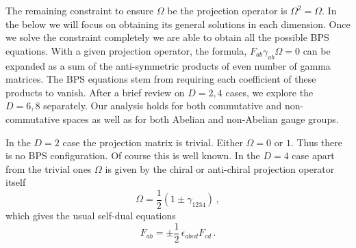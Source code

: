 \documentclass[a4paper,11pt]{article}
\begin{document}
The remaining constraint to ensure $\Omega$ be the projection operator is $\Omega^{2}=\Omega$. In the below we will focus on obtaining its general
solutions in each dimension. Once we solve the constraint completely we are able to obtain all the possible  BPS equations. With a given projection
operator, the formula,  $F_{ab}\gamma_{ab}\Omega =0$ can be expanded as a sum of the anti-symmetric products of even number of gamma matrices. The
BPS equations stem from requiring each coefficient of these products to vanish. After a brief review on $D=2,4$ cases, we explore the $D=6,8$
separately. Our analysis holds for both commutative and non-commutative spaces as well as for both Abelian and non-Abelian gauge groups.


In the $D=2$ case the projection matrix is trivial. Either $\Omega=0$ or $1$. Thus there is no BPS configuration. Of course this is well known. In
the $D=4$ case apart from the trivial ones $\Omega$ is given by the chiral or anti-chiral projection operator itself
\begin{equation}
\Omega=\textstyle{\frac{1}{2}}(1\pm\gamma_{1234})\,,
\end{equation}
which gives the usual self-dual equations
\begin{equation}
F_{ab}=\pm\textstyle{\frac{1}{2}}\,\epsilon_{abcd}F_{cd}\,.
\end{equation}

\end{document}
